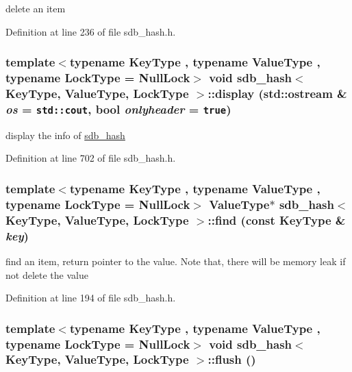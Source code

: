delete an item 

Definition at line 236 of file sdb\_\-hash.h.\hypertarget{classsdb__hash_327527c4f96ea2115450d3b2d0d2ca0d}{
\subsubsection[{display}]{\setlength{\rightskip}{0pt plus 5cm}template$<$typename KeyType , typename ValueType , typename LockType  = NullLock$>$ void {\bf sdb\_\-hash}$<$ KeyType, ValueType, LockType $>$::display (std::ostream \& {\em os} = {\tt std::cout}, \/  bool {\em onlyheader} = {\tt true})}}
\label{classsdb__hash_327527c4f96ea2115450d3b2d0d2ca0d}


display the info of \hyperlink{classsdb__hash}{sdb\_\-hash} 

Definition at line 702 of file sdb\_\-hash.h.\hypertarget{classsdb__hash_9f39e15dd1c45b2b78b508df26c69568}{
\subsubsection[{find}]{\setlength{\rightskip}{0pt plus 5cm}template$<$typename KeyType , typename ValueType , typename LockType  = NullLock$>$ ValueType$\ast$ {\bf sdb\_\-hash}$<$ KeyType, ValueType, LockType $>$::find (const KeyType \& {\em key})}}
\label{classsdb__hash_9f39e15dd1c45b2b78b508df26c69568}


find an item, return pointer to the value. Note that, there will be memory leak if not delete the value 

Definition at line 194 of file sdb\_\-hash.h.\hypertarget{classsdb__hash_6b9f4c1147c4702b863095a324b81cfb}{
\subsubsection[{flush}]{\setlength{\rightskip}{0pt plus 5cm}template$<$typename KeyType , typename ValueType , typename LockType  = NullLock$>$ void {\bf sdb\_\-hash}$<$ KeyType, ValueType, LockType $>$::flush ()}}
\label{classsdb__hash_6b9f4c1147c4702b863095a324b81cfb}


